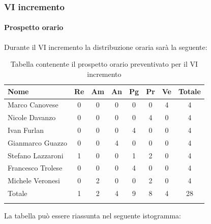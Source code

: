 \subsubsection{VI incremento}
\paragraph{Prospetto orario}
Durante il VI incremento la distribuzione oraria sarà la seguente:

\begin{longtable}{|l|c|c|c|c|c|c|c|}
	\hline
	\rowcolor{lighter-grayer}
	\textbf{Nome}     & \textbf{Re} & \textbf{Am} & \textbf{An} & \textbf{Pg} & \textbf{Pr} & \textbf{Ve} & \textbf{Totale} \\
	\hline
	\endfirsthead

	\hline
	Marco Canovese    & 0           & 0           & 0           & 0           & 0           & 4           & 4               \\
	\hline
	\hline
	Nicole Davanzo    & 0           & 0           & 0           & 0           & 4           & 0           & 4               \\
	\hline
	\hline
	Ivan Furlan       & 0           & 0           & 0           & 4           & 0           & 0           & 4               \\
	\hline
	\hline
	Gianmarco Guazzo  & 0           & 0           & 4           & 0           & 0           & 0           & 4               \\
	\hline
	\hline
	Stefano Lazzaroni & 1           & 0           & 0           & 1           & 2           & 0           & 4               \\
	\hline
	\hline
	Francesco Trolese & 0           & 0           & 0           & 4           & 0           & 0           & 4               \\
	\hline
	\hline
	Michele Veronesi  & 0           & 2           & 0           & 0           & 2           & 0           & 4               \\
	\hline
	\hline
	Totale            & 1           & 2           & 4          & 9           & 8           & 4          & 28              \\
	\hline
	\rowcolor{white}
	\caption{Tabella contenente il prospetto orario preventivato per il VI incremento}
\end{longtable}


La tabella può essere riassunta nel seguente istogramma:


